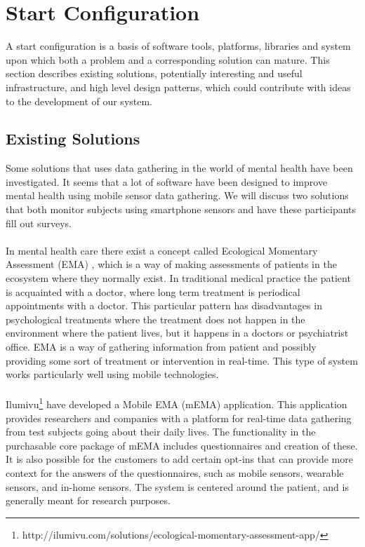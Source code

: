 
\section{Start Configuration}
\label{sec:start_configuration}


A start configuration is a basis of software tools, platforms, libraries and system upon which both a problem and a corresponding solution can mature. This section describes existing solutions, potentially interesting and useful infrastructure, and high level design patterns, which could contribute with ideas to the development of our system.

\subsection{Existing Solutions}
\label{sub:existing_solutions}

Some solutions that uses data gathering in the world of mental health have been investigated. It seems that a lot of software have been designed to improve mental health using mobile sensor data gathering. We will discuss two solutions that both monitor subjects using smartphone sensors and have these participants fill out surveys. 
\\\\
In mental health care there exist a concept called Ecological Momentary Assessment (EMA) \parencite{shiffman2008ecological}, which is a way of making assessments of patients in the ecosystem where they normally exist. In traditional medical practice the patient is acquainted with a doctor, where long term treatment is periodical appointments with a doctor. This particular pattern has disadvantages in psychological treatments where the treatment does not happen in the environment where the patient lives, but it happens in a doctors or psychiatrist office. EMA is a way of gathering information from patient and possibly providing some sort of treatment or intervention in real-time. This type of system works particularly well using mobile technologies.
\\\\
Ilumivu\footnote{http://ilumivu.com/solutions/ecological-momentary-assessment-app/} have developed a Mobile EMA (mEMA) application. This application provides researchers and companies with a platform for real-time data gathering from test subjects going about their daily lives. The functionality in the purchasable core package of mEMA includes questionnaires and creation of these. It is also possible for the customers to add certain opt-ins that can provide more context for the answers of the questionnaires, such as mobile sensors, wearable sensors, and in-home sensors. The system is centered around the patient, and is generally meant for research purposes.

